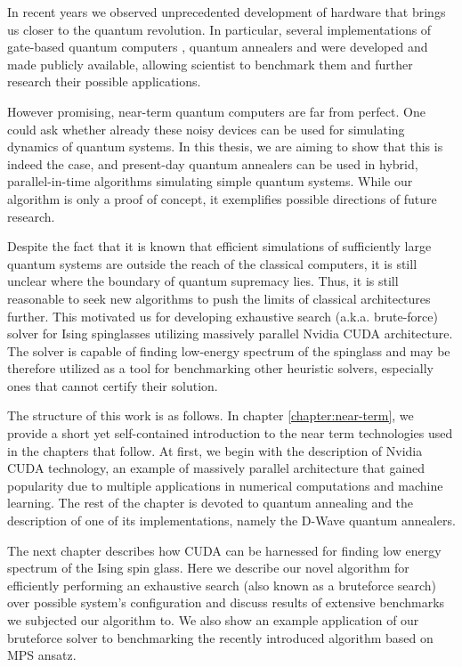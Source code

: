 In recent years we observed unprecedented development of hardware that brings us closer to the quantum revolution. In particular, several implementations of gate-based quantum computers \cite{inq, bohnet}, quantum annealers \cite{johnson, dattani} and were developed and made publicly available, allowing scientist to benchmark them and further research their possible applications.

However promising, near-term quantum computers are far from perfect. One could ask whether already these noisy devices can be used for simulating dynamics of quantum systems. In this thesis, we are aiming to show that this is indeed the case, and present-day quantum annealers can be used in hybrid, parallel-in-time algorithms simulating simple quantum systems. While our algorithm is only a proof of concept, it exemplifies possible directions of future research.

Despite the fact that it is known that efficient simulations of sufficiently large quantum systems are outside the reach of the classical computers, it is still unclear where the boundary of quantum supremacy lies. Thus, it is still reasonable to seek new algorithms to push the limits of classical architectures further. This motivated us for developing exhaustive search (a.k.a. brute-force) solver for Ising spinglasses utilizing massively parallel Nvidia CUDA architecture. The solver is capable of finding low-energy spectrum of the spinglass and may be therefore utilized as a tool for benchmarking other heuristic solvers, especially ones that cannot certify their solution.

The structure of this work is as follows. In chapter \ref{chapter:near-term}, we provide a short yet self-contained introduction to the near term technologies used in the chapters that follow. At first, we begin with the description of Nvidia CUDA technology, an example of massively parallel architecture that gained popularity due to multiple applications in numerical computations and machine learning. The rest of the chapter is devoted to quantum annealing and the description of one of its implementations, namely the D-Wave quantum annealers.

The next chapter describes how CUDA can be harnessed for finding low energy spectrum of the Ising spin glass. Here we describe our novel algorithm for efficiently performing an exhaustive search (also known as a bruteforce search) over possible system's configuration and discuss results of extensive benchmarks we subjected our algorithm to. We also show an example application of our bruteforce solver to benchmarking the recently introduced algorithm based on MPS ansatz.


